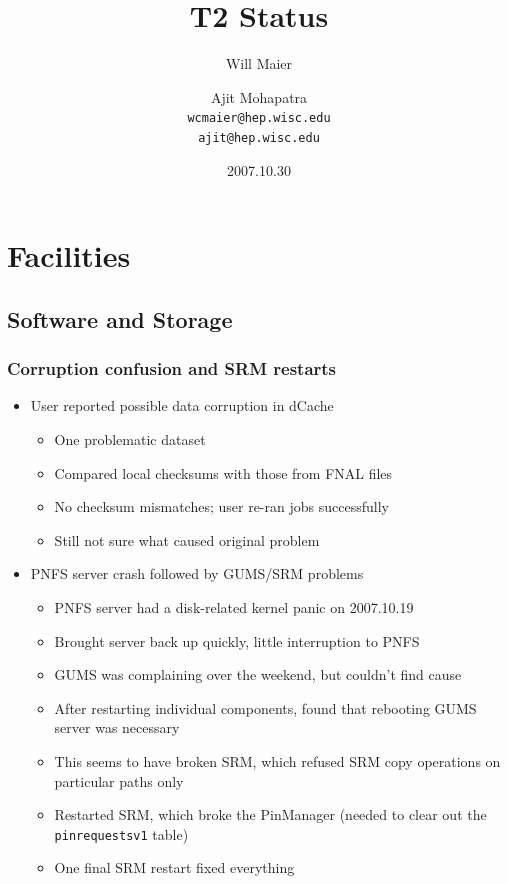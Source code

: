 \documentclass{beamer}
\title{T2 Status}
\author[Maier, Mohapatra]{
    Will Maier \and Ajit Mohapatra\\ 
    {\tt wcmaier@hep.wisc.edu}\\
    {\tt ajit@hep.wisc.edu}}
\institute[Wisconsin]{University of Wisconsin - High Energy Physics}
\date{2007.10.30}
\begin{document}
\begin{frame}
    \titlepage
\end{frame}


\section{Facilities}
\subsection{Software and Storage}
\begin{frame}
\frametitle{Corruption confusion and SRM restarts}
\begin{itemize}
    \item User reported possible data corruption in dCache
    \begin{itemize}
        \item One problematic dataset
        \item Compared local checksums with those from FNAL files
        \item No checksum mismatches; user re-ran jobs successfully
        \item Still not sure what caused original problem
    \end{itemize}
    \item PNFS server crash followed by GUMS/SRM problems
    \begin{itemize}
        \item PNFS server had a disk-related kernel panic on 2007.10.19
        \item Brought server back up quickly, little interruption to PNFS
        \item GUMS was complaining over the weekend, but couldn't find cause
        \item After restarting individual components, found that rebooting GUMS server was necessary
        \item This seems to have broken SRM, which refused SRM copy operations on particular paths only
        \item Restarted SRM, which broke the PinManager (needed to clear out the {\tt pinrequestsv1} table)
        \item One final SRM restart fixed everything
    \end{itemize}
\end{itemize}
\end{frame}
\end{document}
